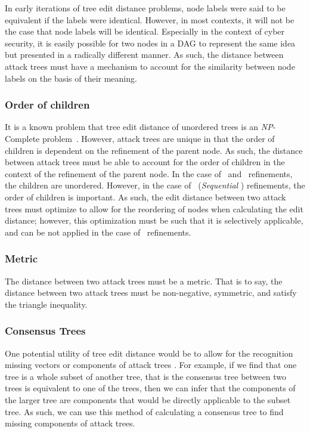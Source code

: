 In early iterations of tree edit distance problems, node labels were said to be equivalent if the labels were identical. However, in most contexts, it will not be the case that node labels will be identical. Especially in the context of cyber security, it is easily possible for two nodes in a DAG to represent the same idea but presented in a radically different manner. As such, the distance between attack trees must have a mechanism to account for the similarity between node labels on the basis of their meaning.

\subsubsection{Order of children}
\label{sssec:order-of-children}

It is a known problem that tree edit distance of unordered trees is an \textit{NP}-Complete problem~\cite{zhang_editing_1992}. However, attack trees are unique in that the order of children is dependent on the refinement of the parent node. As such, the distance between attack trees must be able to account for the order of children in the context of the refinement of the parent node. In the case of \AND\ and \OR\ refinements, the children are unordered. However, in the case of \SAND\ (\emph{Sequential} \AND) refinements, the order of children is important. As such, the edit distance between two attack trees must optimize to allow for the reordering of nodes when calculating the edit distance; however, this optimization must be such that it is selectively applicable, and can be not applied in the case of \SAND\ refinements.

\subsubsection{Metric}
\label{sssec:metric}

The distance between two attack trees must be a metric. That is to say, the distance between two attack trees must be non-negative, symmetric, and satisfy the triangle inequality.



\subsubsection{Consensus Trees}
\label{sssec:consensus-trees}



One potential utility of tree edit distance would be to allow for the recognition missing vectors or components of attack trees . For example, if we find that one tree is a whole subset of another tree, that is the consensus tree between two trees is equivalent to one of the trees, then we can infer that the components of the larger tree are components that would be directly applicable to the subset tree. As such, we can use this method of calculating a consensus tree to find missing components of attack trees.